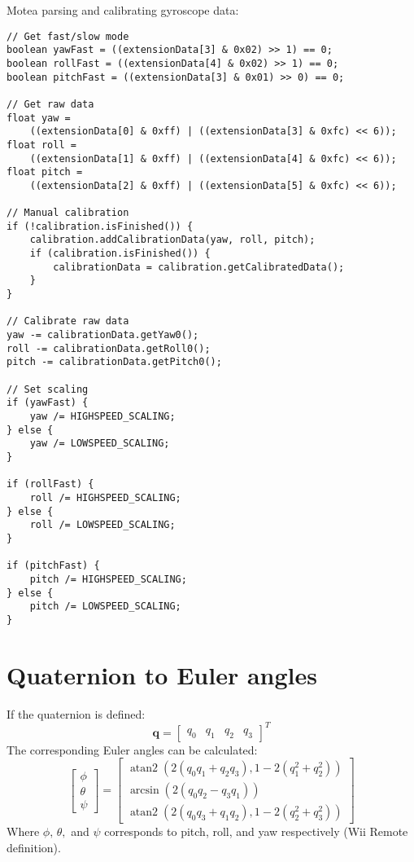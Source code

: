 Motea parsing and calibrating gyroscope data:
\begin{lstlisting}
// Get fast/slow mode
boolean yawFast = ((extensionData[3] & 0x02) >> 1) == 0;
boolean rollFast = ((extensionData[4] & 0x02) >> 1) == 0;
boolean pitchFast = ((extensionData[3] & 0x01) >> 0) == 0;

// Get raw data
float yaw = 
	((extensionData[0] & 0xff) | ((extensionData[3] & 0xfc) << 6));
float roll = 
	((extensionData[1] & 0xff) | ((extensionData[4] & 0xfc) << 6));
float pitch = 
	((extensionData[2] & 0xff) | ((extensionData[5] & 0xfc) << 6));

// Manual calibration
if (!calibration.isFinished()) {
	calibration.addCalibrationData(yaw, roll, pitch);
	if (calibration.isFinished()) {
		calibrationData = calibration.getCalibratedData();
	}
}

// Calibrate raw data
yaw -= calibrationData.getYaw0();
roll -= calibrationData.getRoll0();
pitch -= calibrationData.getPitch0();

// Set scaling
if (yawFast) {
	yaw /= HIGHSPEED_SCALING;
} else {
	yaw /= LOWSPEED_SCALING;
}

if (rollFast) {
	roll /= HIGHSPEED_SCALING;
} else {
	roll /= LOWSPEED_SCALING;
}

if (pitchFast) {
	pitch /= HIGHSPEED_SCALING;
} else {
	pitch /= LOWSPEED_SCALING;
}
\end{lstlisting}

\chapter{Quaternion to Euler angles}
\label{app:eulerConversion}
If the quaternion is defined:
\[
\mathbf{q} = \left[ \begin{array}{cccc} q_0 & q_1 & q_2 & q_3 \end{array} \right ]^T
\]
The corresponding Euler angles can be calculated:
\[
\left [ \begin{array}{c} \phi  \\ \theta  \\ \psi  \end{array} \right ] = \left [ \begin{array}{c} \operatorname{atan2}(2(q_0 q_1 + q_2 q_3), 1 - 2(q_{1}^2 + q_{2}^2)) \\ \arcsin(2(q_0 q_2 - q_3 q_1)) \\ \operatorname{atan2}(2(q_0 q_3 + q_1 q_2), 1- 2(q_2^2 + q_3^2))\end{array} \right ]
\]
Where $\phi,\, \theta,$ and $ \psi$ corresponds to pitch, roll, and yaw respectively (Wii Remote definition).

